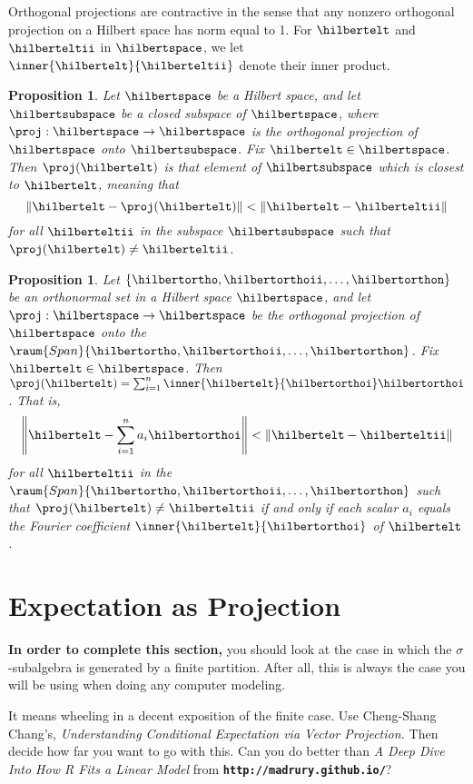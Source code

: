 \documentclass[
twoside=true,
paper=letter,
fontsize=9pt,
pagesize=auto,
leqno,
openany,
headsepline,
overfullrule,
]{scrbook}
\theoremstyle{plain}
\theoremstyle{plain}
\newtheorem{prop}[thm]{Proposition}
\theoremstyle{definition}
\theoremstyle{bfnoteitalic}
\theoremstyle{bfnoteroman}
\newcommand{\cf}[1]{\textbf{\texttt{#1}}}
\newcommand{\textsigma}{\hbox{\large{$\sigma$}}\kern-1pt}
\newcommand{\norm}[1]{\left\Vert#1\right\Vert}
\begin{document}
Orthogonal projections are contractive in the sense that any nonzero orthogonal projection on a Hilbert space has norm equal to 1.
For $\hilbertelt$ and $\hilberteltii$ in $\hilbertspace$, we let 
$\inner{\hilbertelt}{\hilberteltii}$ denote their inner product.

\begin{prop}
Let $\hilbertspace$ be a Hilbert space, and let $\hilbertsubspace$ be a closed subspace of $\hilbertspace$, where $\proj :\hilbertspace \to \hilbertspace$ is the orthogonal projection of $\hilbertspace$ onto $\hilbertsubspace$. Fix $\hilbertelt\in \hilbertspace$. Then $\proj(\hilbertelt)$ is that element of $\hilbertsubspace$ which is closest to $\hilbertelt$, meaning that
\[
\norm{\hilbertelt-\proj(\hilbertelt)}<\norm{\hilbertelt-\hilberteltii} 
\]
for all $\hilberteltii$ in the subspace $\hilbertsubspace$ such that 
$\proj(\hilbertelt)\neq \hilberteltii$.
\end{prop}



\begin{prop}
Let $\{\hilbertortho, \hilbertorthoii, \ldots, \hilbertorthon\}$ be an orthonormal set in a Hilbert space $\hilbertspace$, and let $\proj:\hilbertspace \to \hilbertspace$ be the orthogonal projection of $\hilbertspace$ onto the 
$\raum{Span}\{\hilbertortho, \hilbertorthoii, \ldots, \hilbertorthon\}$. 
Fix $\hilbertelt\in\hilbertspace$. Then 
$\proj(\hilbertelt) = \sum_{i=1}^{n} \inner{\hilbertelt}{\hilbertorthoi}\hilbertorthoi$. 
That is, 
\[
\norm{\hilbertelt - \sum_{i=1}^n a_i \hilbertorthoi} < 
\norm{\hilbertelt-\hilberteltii}
\]
for all 
$\hilberteltii$ in the $\raum{Span}\{\hilbertortho, \hilbertorthoii, \ldots, \hilbertorthon\}$ 
such that $\proj(\hilbertelt)\neq \hilberteltii$ 
if and only if  each scalar  $a_i$ equals the Fourier coefficient 
$\inner{\hilbertelt}{\hilbertorthoi}$ of $\hilbertelt$. 
\end{prop}





\section{Expectation as Projection}
\begin{quoting}
\textbf{In order to complete this section,}
you should look at the case in which the \textsigma\hyp{}subalgebra is generated by a finite partition.  After all, this is always the case you will be using when doing any computer modeling.

It means wheeling in a decent exposition of the finite case. Use Cheng\hyp{}Shang Chang's,
\textsl{Understanding Conditional Expectation via Vector Projection.}
Then decide how far you want to go with this. Can you do better than
\textsl{A Deep Dive Into How R Fits a Linear Model} from
\cf{http://madrury.github.io/}?
\end{quoting}
\end{document}
